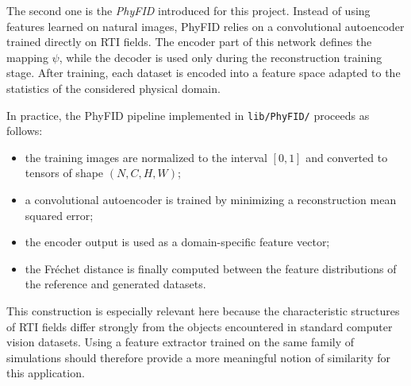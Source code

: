 The second one is the \emph{PhyFID} introduced for this project. Instead of
using features learned on natural images, PhyFID relies on a convolutional
autoencoder trained directly on RTI fields. The encoder part of this network
defines the mapping $\psi$, while the decoder is used only during the
reconstruction training stage. After training, each dataset is encoded into a
feature space adapted to the statistics of the considered physical domain.

In practice, the PhyFID pipeline implemented in
\texttt{lib/PhyFID/} proceeds as follows:

\begin{itemize}
    \item the training images are normalized to the interval $[0,1]$ and
    converted to tensors of shape $(N,C,H,W)$;
    \item a convolutional autoencoder is trained by minimizing a reconstruction
    mean squared error;
    \item the encoder output is used as a domain-specific feature vector;
    \item the Fr\'echet distance is finally computed between the feature
    distributions of the reference and generated datasets.
\end{itemize}

This construction is especially relevant here because the characteristic
structures of RTI fields differ strongly from the objects encountered in
standard computer vision datasets. Using a feature extractor trained on the
same family of simulations should therefore provide a more meaningful notion of
similarity for this application.


